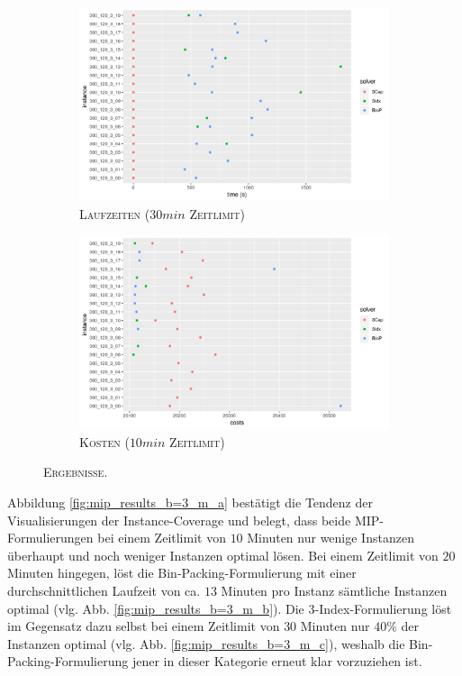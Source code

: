 \begin{figure}[H]
\centering
\begin{subfigure}[b]{0.4\textwidth}
\centering
\includegraphics[width=1.3\textwidth]{img/solver_instance_time_b=3_m_1800s.png}
\caption{\textsc{Laufzeiten ($30min$ Zeitlimit)}}
\label{fig:b=3_m_runtimes}
\end{subfigure}
\hfill
\begin{subfigure}[b]{0.4\textwidth}
\centering
\includegraphics[width=1.3\textwidth]{img/solver_instance_cost_b=3_m_600s.png}
\caption{\textsc{Kosten ($10min$ Zeitlimit)}}
\label{fig:b=3_m_costs}
\end{subfigure}
\caption{\textsc{Ergebnisse}.}
\end{figure}

Abbildung \ref{fig:mip_results_b=3_m_a} bestätigt die Tendenz der Visualisierungen der Instance-Coverage und belegt,
dass beide MIP-Formulierungen bei einem Zeitlimit von $10$ Minuten nur wenige Instanzen überhaupt und noch weniger
Instanzen optimal lösen.
Bei einem Zeitlimit von $20$ Minuten hingegen, löst die Bin-Packing-Formulierung mit einer durchschnittlichen
Laufzeit von ca. $13$ Minuten pro Instanz sämtliche Instanzen optimal (vlg. Abb. \ref{fig:mip_results_b=3_m_b}).
Die 3-Index-Formulierung löst im Gegensatz dazu selbst bei einem Zeitlimit von $30$ Minuten nur $40 \%$ der Instanzen
optimal (vlg. Abb. \ref{fig:mip_results_b=3_m_c}), weshalb die Bin-Packing-Formulierung jener in dieser Kategorie erneut
klar vorzuziehen ist.

